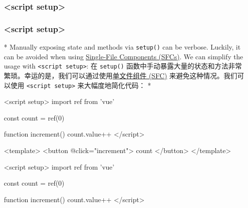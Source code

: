 \begin{paracol}{2}
\subsubsection{\textless script setup\textgreater{}}
\switchcolumn
\subsubsection{\textless script setup\textgreater{}}
\switchcolumn[0]*%
Manually exposing state and methods via \texttt{setup()} can be verbose.
Luckily, it can be avoided when using
\href{https://vuejs.org/guide/scaling-up/sfc.html}{Single-File
Components (SFCs)}. We can simplify the usage with
\texttt{\textless{}script\ setup\textgreater{}}:
\switchcolumn
在 \texttt{setup()}
函数中手动暴露大量的状态和方法非常繁琐。幸运的是，我们可以通过使用\href{https://cn.vuejs.org/guide/scaling-up/sfc.html}{单文件组件
(SFC)} 来避免这种情况。我们可以使用
\texttt{\textless{}script\ setup\textgreater{}} 来大幅度地简化代码：
\switchcolumn[0]*%
\begin{codeVue}
<script setup>
import { ref } from 'vue'

const count = ref(0)

function increment() {
    count.value++
}
</script>

<template>
    <button @click="increment">
    {{ count }}
    </button>
</template>
\end{codeVue}
\switchcolumn
\begin{codeVue}
<script setup>
import { ref } from 'vue'

const count = ref(0)

function increment() {
    count.value++
}
</script>


\end{codeVue}
\end{paracol}
